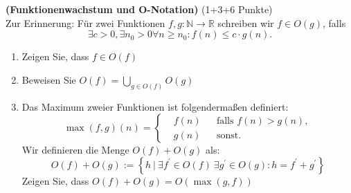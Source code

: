 \documentclass{article}
\begin{document}
\bigskip
{}  \quad\textbf{(Funktionenwachstum und O-Notation)} \quad(1+3+6 Punkte)\\

\noindent
Zur Erinnerung: Für zwei Funktionen $f,g\colon \mathbb N \rightarrow \mathbb R $ schreiben wir $f \in O(g)$, falls
 $$\exists c > 0, \exists n_0 > 0 \forall n \geq n_0: f(n)\leq c\cdot g(n).$$ 
\begin{enumerate}
\item Zeigen Sie, dass  $f \in O(f)$
\item Beweisen Sie $O(f) = \bigcup \limits_{g \in O(f)} O(g)$
\item Das Maximum zweier Funktionen ist folgendermaßen definiert:
  $$\max(f, g)(n) =
  \left\{
    \begin{aligned}
      &f(n) && \text{falls } f(n) > g(n),\\
      &g(n) &&\text{sonst.}
    \end{aligned}
  \right.$$ 
Wir definieren die Menge $O(f) + O(g)$ als:
$$
O(f) + O(g) :=
\left\{
h \ |\  \exists f^\prime \in O(f)\ \exists g^\prime \in O(g): h = f^\prime + g^\prime
\right\}
$$
Zeigen Sie, dass $O(f) + O(g) = O(\max(g,f))$
\end{enumerate}

\newpage
\end{document}
